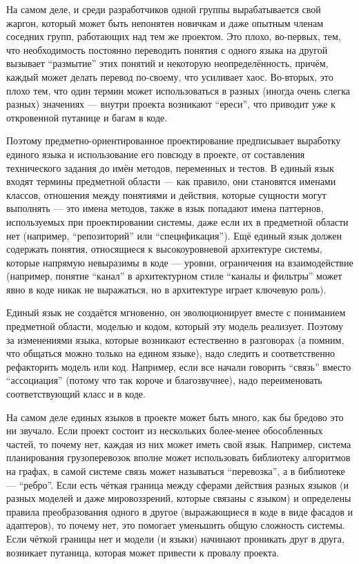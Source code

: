 \documentclass[a5paper]{article}
\begin{document}
На самом деле, и среди разработчиков одной группы вырабатывается свой жаргон, который может быть непонятен новичкам и даже опытным членам соседних групп, работающих над тем же проектом. Это плохо, во-первых, тем, что необходимость постоянно переводить понятия с одного языка на другой вызывает ``размытие'' этих понятий и некоторую неопределённость, причём, каждый может делать перевод по-своему, что усиливает хаос. Во-вторых, это плохо тем, что один термин может использоваться в разных (иногда очень слегка разных) значениях --- внутри проекта возникают ``ереси'', что приводит уже к откровенной путанице и багам в коде.

Поэтому предметно-ориентированное проектирование предписывает выработку единого языка и использование его повсюду в проекте, от составления технического задания до имён методов, переменных и тестов. В единый язык входят термины предметной области --- как правило, они становятся именами классов, отношения между понятиями и действия, которые сущности могут выполнять --- это имена методов, также в язык попадают имена паттернов, используемых при проектировании системы, даже если их в предметной области нет (например, ``репозиторий'' или ``спецификация''). Ещё единый язык должен содержать понятия, относящиеся к высокоуровневой архитектуре системы, которые напрямую невыразимы в коде --- уровни, ограничения на взаимодействие (например, понятие ``канал'' в архитектурном стиле ``каналы и фильтры'' может явно в коде никак не выражаться, но в архитектуре играет ключевую роль).

Единый язык не создаётся мгновенно, он эволюционирует вместе с пониманием предметной области, моделью и кодом, который эту модель реализует. Поэтому за изменениями языка, которые возникают естественно в разговорах (а помним, что общаться можно только на едином языке), надо следить и соответственно рефакторить модель или код. Например, если все начали говорить ``связь'' вместо ``ассоциация'' (потому что так короче и благозвучнее), надо переименовать соответствующий класс и в коде.

На самом деле единых языков в проекте может быть много, как бы бредово это ни звучало. Если проект состоит из нескольких более-менее обособленных частей, то почему нет, каждая из них может иметь свой язык. Например, система планирования грузоперевозок вполне может использовать библиотеку алгоритмов на графах, в самой системе связь может называться ``перевозка'', а в библиотеке --- ``ребро''. Если есть чёткая граница между сферами действия разных языков (и разных моделей и даже мировоззрений, которые связаны с языком) и определены правила преобразования одного в другое (выражающиеся в коде в виде фасадов и адаптеров), то почему нет, это помогает уменьшить общую сложность системы. Если чёткой границы нет и модели (и языки) начинают проникать друг в друга, возникает путаница, которая может привести к провалу проекта.
\end{document}
